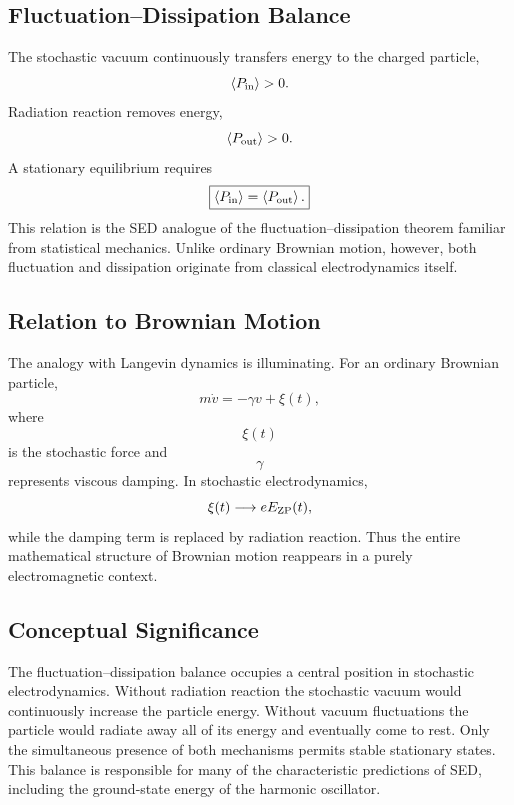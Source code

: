 \subsection{Fluctuation--Dissipation Balance}
The stochastic vacuum continuously transfers energy to the charged
particle,
\[\left<P_{\rm in}\right>>0.\]
Radiation reaction removes energy,
\[\left<P_{\rm out}\right>>0.\]
A stationary equilibrium requires
\begin{equation}
\boxed{\left<P_{\rm in}\right>=\left<P_{\rm out}\right>.}
\label{eq:FDT}
\end{equation}
This relation is the SED analogue of the fluctuation--dissipation
theorem familiar from statistical mechanics.
Unlike ordinary Brownian motion, however, both fluctuation and
dissipation originate from classical electrodynamics itself.
\subsection{Relation to Brownian Motion}
The analogy with Langevin dynamics is illuminating.
For an ordinary Brownian particle,
\[m\dot v=-\gamma v+\xi(t),\]
where
\[\xi(t)\]
is the stochastic force and
\[\gamma\]
represents viscous damping.
In stochastic electrodynamics,
\[\xi(t)\longrightarrow eE_{\rm ZP}(t),\]
while the damping term is replaced by radiation reaction.
Thus the entire mathematical structure of Brownian motion reappears in a
purely electromagnetic context.
\subsection{Conceptual Significance}
The fluctuation--dissipation balance occupies a central position in
stochastic electrodynamics.
Without radiation reaction the stochastic vacuum would continuously
increase the particle energy.
Without vacuum fluctuations the particle would radiate away all of its
energy and eventually come to rest.
Only the simultaneous presence of both mechanisms permits stable
stationary states.
This balance is responsible for many of the characteristic predictions
of SED, including the ground-state energy of the harmonic oscillator.
